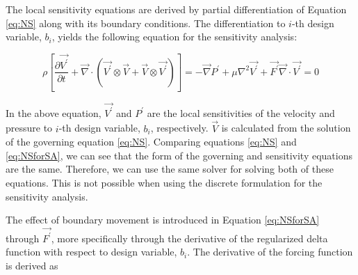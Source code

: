 \documentclass[12pt]{aiaa-pretty}
\begin{document}
The local sensitivity equations are derived by partial differentiation of Equation \eqref{eq:NS} along with its boundary conditions. The differentiation to $i$-th design variable, $b_i$, yields the following equation for the sensitivity analysis:

%
\begin{subequations}\label{eq:NSforSA}
\begin{equation}
	\rho \left[
	\frac{\partial \vec{V^\prime}}{\partial t} + 
	\vec{\nabla} \cdot \left( \vec{V^\prime} \otimes \vec{V} + \vec{V} \otimes \vec{V^\prime} \right) 
	\right] = 
	-\vec{\nabla} P^\prime + \mu \nabla^2 \vec{V^\prime} + \vec{F^\prime}
\end{equation}
\begin{equation}
	\vec{\nabla} \cdot \vec{V^\prime} = 0
\end{equation}
\end{subequations}
%

In the above equation, $\vec{V^\prime}$ and $P^\prime$ are the local sensitivities of the velocity and pressure to $i$-th design variable, $b_i$, respectively. $\vec{V}$ is calculated from the solution of the governing equation \eqref{eq:NS}. Comparing equations \eqref{eq:NS} and \eqref{eq:NSforSA}, we can see that the form of the governing and sensitivity equations are the same. Therefore, we can use the same solver for solving both of these equations. This is not possible when using the discrete formulation for the sensitivity analysis.

The effect of boundary movement is introduced in Equation \eqref{eq:NSforSA} through $\vec{F^\prime}$, more specifically through the derivative of the regularized delta function with respect to design variable, $b_i$. The derivative of the forcing function is derived as
\end{document}
